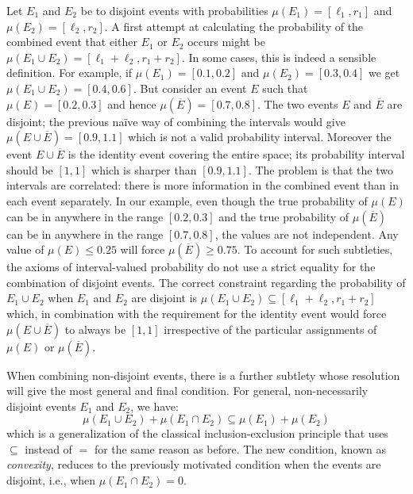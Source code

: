 \documentclass[english,reprint, aps, prl,superscriptaddress, showpacs,
showkeys, longbibliography, amsmath, amssymb]{revtex4-1}
\theoremstyle{plain}
\theoremstyle{definition}
\newcommand{\nb}{\nolinebreak[1] }
\begin{document}
Let $E_1$ and $E_2$ be to disjoint events with probabilities
$\mu(E_1)=[\ell_1,r_1]$ and $\mu(E_2)=[\ell_2,r_2]$. A first attempt
at calculating the probability of the combined event that either $E_1$
or $E_2$ occurs might be $\mu(E_1\cup E_2) = [\ell_1+\ell_2,r_1+r_2]$. In
some cases, this is indeed a sensible definition. For example, if
$\mu(E_1)=[0.1,0.2]$ and $\mu(E_2)=[0.3,0.4]$ we get
$\mu(E_1\cup E_2) = [0.4,0.6]$. But consider an event $E$ such that
$\mu(E)=[0.2,0.3]$ and hence $\mu(\overline{E})=[0.7,0.8]$. The two
events $E$ and $\overline{E}$ are disjoint; the previous naïve way
of combining the intervals would give $\mu(E\cup\overline{E})=[0.9,1.1]$
which is not a valid probability interval. Moreover the event
$E\cup\overline{E}$ is the identity event covering the entire space; its
probability interval should be $[1,1]$ which is sharper than
$[0.9,1.1]$. The problem is that the two intervals are correlated:
there is more information in the combined event than in each event
separately. In our example, even though the true probability of
$\mu(E)$ can be in anywhere in the range $[0.2,0.3]$ and the true
probability of $\mu(\overline{E})$ can be in anywhere in the range
$[0.7,0.8]$, the values are not independent. Any value of
$\mu(E) \leq 0.25$ will force $\mu(\overline{E})\geq 0.75$. To account
for such subtleties, the axioms of interval-valued probability do not
use a strict equality for the combination of disjoint events. The
correct constraint regarding the probability of $E_1\cup E_2$ when $E_1$
and $E_2$ are disjoint is
$\mu(E_1\cup E_2) \subseteq [\ell_1+\ell_2,r_1+r_2]$ which, in combination
with the requirement for the identity event would force
$\mu(E\cup\overline{E})$ to always be $[1,1]$ irrespective of the
particular assignments of $\mu(E)$ or $\mu(\overline{E})$. 

When combining non-disjoint events, there is a further subtlety whose
resolution will give the most general and final condition. For
general, non-necessarily disjoint events $E_1$ and $E_2$, we have:
\begin{equation}
\mu(E_1\cup E_2) + \mu(E_1\cap E_2) \subseteq \mu(E_1) + \mu(E_2)
\label{eq:classicalconvex}
\end{equation}
which is a generalization of the classical inclusion-exclusion
principle that uses $\subseteq$ instead of $=$ for the same reason as
before. The new condition, known as
\emph{convexity}\nb\cite{Shapley1971,GilboaSchmeidler1994,Grabisch2016},
reduces to the previously
motivated condition when the events are disjoint, i.e., when
$\mu(E_1\cap E_2) = 0$.
\end{document}
